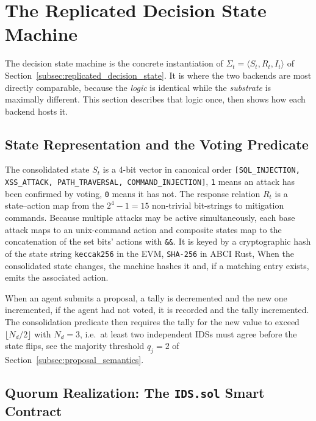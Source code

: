 \section{The Replicated Decision State Machine}
\label{sec:impl_state_machine}

The decision state machine is the concrete instantiation of $\Sigma_t=\langle S_t, R_t, I_t\rangle$ of Section~\ref{subsec:replicated_decision_state}. It is where the two backends are most directly comparable, because the \emph{logic} is identical while the \emph{substrate} is maximally different. This section describes that logic once, then shows how each backend hosts it.

\subsection{State Representation and the Voting Predicate}
\label{subsec:impl_state_repr}

The consolidated state $S_t$ is a 4-bit vector in canonical order \texttt{[SQL\_INJECTION, XSS\_ATTACK, PATH\_TRAVERSAL, COMMAND\_INJECTION]}, \texttt{1} means an attack has been confirmed by voting, \texttt{0} means it has not. The response relation $R_t$ is a state--action map from the $2^4-1=15$ non-trivial bit-strings to mitigation commands. Because multiple attacks may be active simultaneously, each base attack maps to an unix-command action and composite states map to the concatenation of the set bits' actions with \texttt{\&\&}. It is keyed by a cryptographic hash of the state string \texttt{keccak256} in the EVM, \texttt{SHA-256} in ABCI Rust, When the consolidated state changes, the machine hashes it and, if a matching entry exists, emits the associated action.

When an agent submits a proposal, a tally is decremented and the new one incremented, if the agent had not voted, it is recorded and the tally incremented. The consolidation predicate then requires the tally for the new value to exceed $\lfloor N_d/2\rfloor$ with $N_d=3$, i.e.\ at least two independent IDSs must agree before the state flips, see the majority threshold $q_j=2$ of Section~\ref{subsec:proposal_semantics}.

\subsection{Quorum Realization: The \texttt{IDS.sol} Smart Contract}
\label{subsec:impl_quorum_contract}

